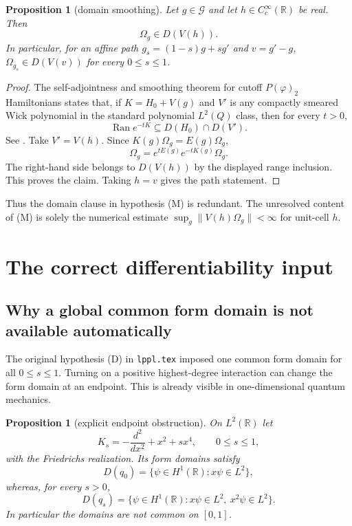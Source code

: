 \documentclass[11pt,a4paper]{article}
\newtheorem{proposition}[theorem]{Proposition}
\theoremstyle{remark}
\newcommand{\R}{\mathbb R}
\newcommand{\Om}{\Omega}
\newcommand{\G}{\mathcal G}
\begin{document}
\begin{proposition}[domain smoothing]\label{prop:domain}
Let $g\in\G$ and let $h\in C_c^\infty(\R)$ be real.  Then
\[
 \Om_g\in D(V(h)).
\]
In particular, for an affine path $g_s=(1-s)g+sg'$ and $v=g'-g$,
$\Om_{g_s}\in D(V(v))$ for every $0\le s\le1$.
\end{proposition}

\begin{proof}
The self-adjointness and smoothing theorem for cutoff $P(\varphi)_2$ Hamiltonians states that, if
$K=H_0+V(g)$ and $V'$ is any compactly smeared Wick polynomial in the standard polynomial
$L^2(Q)$ class, then for every $t>0$,
\[
 \operatorname{Ran}e^{-tK}\subseteq D(H_0)\cap D(V').
\]
See \cite[Ch.~7, Thm.~7.3 and Lem.~7.4]{GJModels}.  Take $V'=V(h)$.  Since
$K(g)\Om_g=E(g)\Om_g$,
\[
 \Om_g=e^{tE(g)}e^{-tK(g)}\Om_g.
\]
The right-hand side belongs to $D(V(h))$ by the displayed range inclusion.  This proves the
claim.  Taking $h=v$ gives the path statement.
\end{proof}

Thus the domain clause in hypothesis (M) is redundant.  The unresolved content of (M) is solely
the numerical estimate $\sup_g\|V(h)\Om_g\|<\infty$ for unit-cell $h$.

\section{The correct differentiability input}\label{sec:path}

\subsection{Why a global common form domain is not available automatically}

The original hypothesis (D) in \texttt{lppl.tex} imposed one common form domain for all
$0\le s\le1$.  Turning on a positive highest-degree interaction can change the form domain at an
endpoint.  This is already visible in one-dimensional quantum mechanics.

\begin{proposition}[explicit endpoint obstruction]\label{prop:oscillator}
On $L^2(\R)$ let
\[
 K_s=-\frac{d^2}{dx^2}+x^2+s x^4,\qquad 0\le s\le1,
\]
with the Friedrichs realization.  Its form domains satisfy
\[
 D(q_0)=\{\psi\in H^1(\R):x\psi\in L^2\},
\]
whereas, for every $s>0$,
\[
 D(q_s)=\{\psi\in H^1(\R):x\psi\in L^2,\ x^2\psi\in L^2\}.
\]
In particular the domains are not common on $[0,1]$.
\end{proposition}
\end{document}
